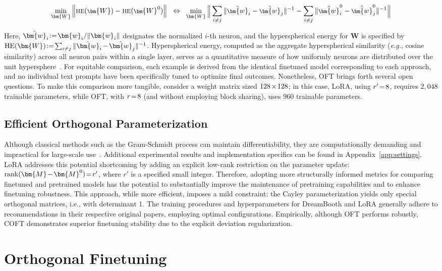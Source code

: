 \begin{equation}\label{eq:oft_principle}
\footnotesize
\min_{\bm{W}} \left\| \text{HE}(\bm{W})-\text{HE}(\bm{W}^0)\right\|~~\Leftrightarrow~~\min_{\bm{W}} \bigg{\|} \sum_{i\neq j} \|\hat{\bm{w}}_i-\hat{\bm{w}}_j\|^{-1}-\sum_{i\neq j} \|\hat{\bm{w}}^0_i-\hat{\bm{w}}^0_j\|^{-1}\bigg{\|}
\end{equation}

Here, $\thickmuskip=2mu \medmuskip=2mu \hat{\bm{w}}_i:=\bm{w}_i/\|\bm{w}_i\|$ designates the normalized $i$-th neuron, and the hyperspherical energy for $\bm{W}$ is specified by $\thickmuskip=2mu \medmuskip=2mu \text{HE}(\bm{W}):= \sum_{i\neq j} \|\hat{\bm{w}}_i-\hat{\bm{w}}_j\|^{-1}$. Hyperspherical energy, computed as the aggregate hyperspherical similarity (\emph{e.g.}, cosine similarity) across all neuron pairs within a single layer, serves as a quantitative measure of how uniformly neurons are distributed over the unit hypersphere~\cite{liu2021learning}. For equitable comparison, each example is derived from the identical finetuned model corresponding to each approach, and no individual text prompts have been specifically tuned to optimize final outcomes. Nonetheless, OFT brings forth several open questions. To make this comparison more tangible, consider a weight matrix sized $\thickmuskip=2mu \medmuskip=2mu 128\times 128$; in this case, LoRA, using $\thickmuskip=2mu \medmuskip=2mu r'=8$, requires $2,048$ trainable parameters, while OFT, with $\thickmuskip=2mu \medmuskip=2mu r=8$ (and without employing block sharing), uses $960$ trainable parameters. \subsection{Efficient Orthogonal Parameterization}\label{sect:eff_ortho}

Although classical methods such as the Gram-Schmidt process can maintain differentiability, they are computationally demanding and impractical for large-scale use~\cite{liu2021orthogonal}. Additional experimental results and implementation specifics can be found in Appendix~\ref{app:settings}. LoRA addresses this potential shortcoming by adding an explicit low-rank restriction on the parameter update: $\thickmuskip=2mu \medmuskip=2mu \text{rank}(\bm{M} - \bm{M}^0)=r'$, where $r'$ is a specified small integer. Therefore, adopting more structurally informed metrics for comparing finetuned and pretrained models has the potential to substantially improve the maintenance of pretraining capabilities and to enhance finetuning robustness. This approach, while more efficient, imposes a mild constraint: the Cayley parameterization yields only special orthogonal matrices, i.e., with determinant 1. The training procedures and hyperparameters for DreamBooth and LoRA generally adhere to recommendations in their respective original papers, employing optimal configurations. Empirically, although OFT performs robustly, COFT demonstrates superior finetuning stability due to the explicit deviation regularization. \section{Orthogonal Finetuning}

